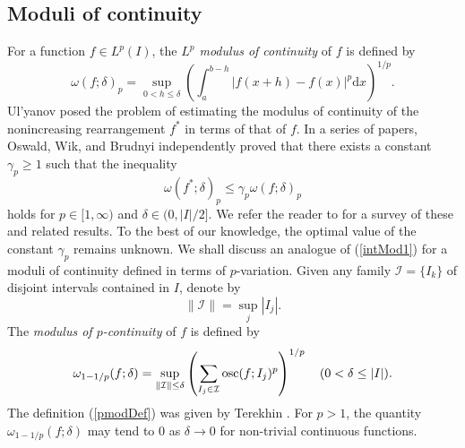 \documentclass{amsart}
\DeclareMathOperator{\osc}{{\rm osc}}
\numberwithin{equation}{section}
\begin{document}
\subsection{Moduli of continuity}
For a function $f\in L^p(I)$, the \emph{$L^p$ modulus of continuity} of $f$ is defined by
\begin{equation}
    \nonumber
    \omega(f;\delta)_p=\sup_{0<h\le\delta}\left(\int_a^{b-h}|f(x+h)-f(x)|^p\mathrm{d}x\right)^{1/p}.
\end{equation}
Ul'yanov posed the problem of estimating the modulus of continuity of the nonincreasing rearrangement $f^*$ in terms of that of $f$. In a series of papers, Oswald, Wik, and Brudnyi independently proved that there exists a constant $\gamma_p\ge1$ such that the inequality 
\begin{equation}
    \label{intMod1}
    \omega(f^*;\delta)_p\le \gamma_p\omega(f;\delta)_p
\end{equation}
holds for $p\in[1,\infty)$ and $\delta\in(0,|I|/2]$. We refer the reader to \cite[Section 4.2]{Ko07} for a survey of these and related results. To the best of our knowledge, the optimal value of the constant $\gamma_p$ remains unknown. We shall discuss an analogue of (\ref{intMod1}) for a moduli of continuity defined in terms of $p$-variation. Given any family $\mathcal{I}=\{I_k\}$ of disjoint intervals contained in $I$, denote by 
\begin{equation}
    \nonumber
    \|\mathcal{I}\|=\sup_j|I_j|.
\end{equation}
The \emph{modulus of $p$-continuity} of $f$ is defined by
\begin{equation}
    \label{pmodDef}
    \omega_{1-1/p}(f;\delta)=\sup_{\|\mathcal{I}\|\le\delta}\left(\sum_{I_j\in\mathcal{I}}\osc(f;I_j)^p\right)^{1/p}\quad(0<\delta\le|I|).
\end{equation}
The definition (\ref{pmodDef}) was given by Terekhin \cite{Te67}.
For $p>1$, the quantity $\omega_{1-1/p}(f;\delta)$ may tend to 0 as $\delta\rightarrow0$ for non-trivial continuous functions. 
\end{document}
